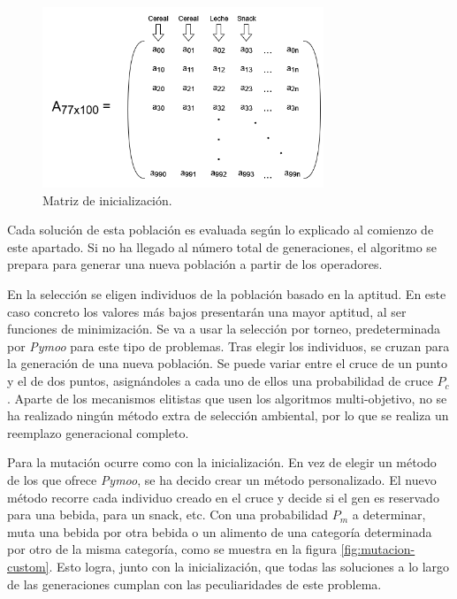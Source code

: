 \begin{figure}[H]
    \centering
    \includegraphics[width=0.75\textwidth]{figures/matriz-inicializacion.png}
    \caption{Matriz de inicialización.}
    \label{fig:matriz-inicializacion}
\end{figure}

Cada solución de esta población es evaluada según lo explicado al comienzo de este apartado. Si no ha llegado al número total de generaciones, el algoritmo se prepara para generar una nueva población a partir de los operadores.

En la selección se eligen individuos de la población basado en la aptitud. En este caso concreto los valores más bajos presentarán una mayor aptitud, al ser funciones de minimización. Se va a usar la selección por torneo, predeterminada por \textit{Pymoo} para este tipo de problemas.
\newpage
Tras elegir los individuos, se cruzan para la generación de una nueva población.  Se puede variar entre el cruce de un punto y el de dos puntos, asignándoles a cada uno de ellos una probabilidad de cruce \(P_c\)  . Aparte de los mecanismos elitistas que usen los algoritmos multi-objetivo, no se ha realizado ningún método extra de selección ambiental, por lo que se realiza un reemplazo generacional completo.

Para la mutación ocurre como con la inicialización. En vez de elegir un método de los que ofrece \textit{Pymoo}, se ha decido crear un método personalizado. El nuevo método recorre cada individuo creado en el cruce y decide si el gen es reservado para una bebida, para un snack, etc. Con una probabilidad \(P_m\) a determinar, muta una bebida por otra bebida o un alimento de una categoría determinada por otro de la misma categoría, como se muestra en la figura \ref{fig:mutacion-custom}. Esto logra, junto con la inicialización, que todas las soluciones a lo largo de las generaciones cumplan con las peculiaridades de este problema.


